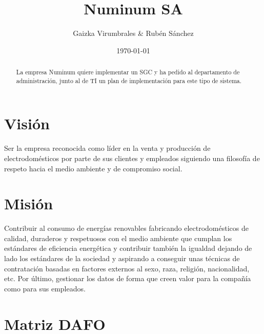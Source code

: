 \documentclass[a4paper]{article}
\title{Numinum SA}
\author{Gaizka Virumbrales \& Rubén Sánchez}
\date{\today}
\begin{document}
\maketitle
\begin{abstract}
La empresa Numinum quiere implementar un SGC y ha pedido al departamento de administración, junto al de TI un plan de implementación para este tipo de sistema.
\end{abstract}


\renewcommand{\contentsname}{Tabla de contenido}
\tableofcontents
\newpage

\section{Visión}
\label{sec:vision}

Ser la empresa reconocida como líder en la venta y producción de electrodomésticos por parte de sus clientes y empleados siguiendo una filosofía de respeto hacia el medio ambiente y de compromiso social.

\section{Misión}
\label{sec:mision}

Contribuir al consumo de energías renovables fabricando electrodomésticos de calidad, duraderos y respetuosos con el medio ambiente que cumplan los estándares de eficiencia energética y contribuir también la igualdad dejando de lado los estándares de la sociedad y aspirando a conseguir unas técnicas de contratación basadas en factores externos al sexo, raza, religión, nacionalidad, etc. Por último, gestionar los datos de forma que creen valor para la compañía como para sus empleados.

\section{Matriz DAFO}
\end{document}
